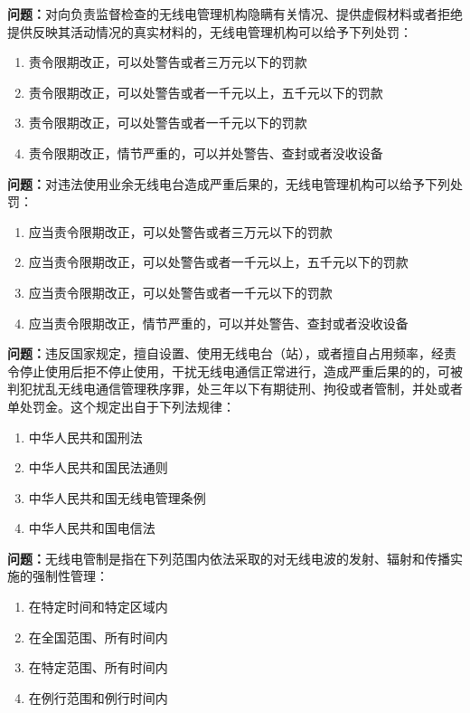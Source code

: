 \bigskip


\noindent\textbf{问题：}对向负责监督检查的无线电管理机构隐瞒有关情况、提供虚假材料或者拒绝提供反映其活动情况的真实材料的，无线电管理机构可以给予下列处罚：
\begin{enumerate}[label=\Alph*), leftmargin=3em]
\item 责令限期改正，可以处警告或者三万元以下的罚款
\item 责令限期改正，可以处警告或者一千元以上，五千元以下的罚款
\item 责令限期改正，可以处警告或者一千元以下的罚款
\item 责令限期改正，情节严重的，可以并处警告、查封或者没收设备
\end{enumerate}

\bigskip


\noindent\textbf{问题：}对违法使用业余无线电台造成严重后果的，无线电管理机构可以给予下列处罚：
\begin{enumerate}[label=\Alph*), leftmargin=3em]
\item 应当责令限期改正，可以处警告或者三万元以下的罚款
\item 应当责令限期改正，可以处警告或者一千元以上，五千元以下的罚款
\item 应当责令限期改正，可以处警告或者一千元以下的罚款
\item 应当责令限期改正，情节严重的，可以并处警告、查封或者没收设备
\end{enumerate}

\bigskip


\noindent\textbf{问题：}违反国家规定，擅自设置、使用无线电台（站），或者擅自占用频率，经责令停止使用后拒不停止使用，干扰无线电通信正常进行，造成严重后果的的，可被判犯扰乱无线电通信管理秩序罪，处三年以下有期徒刑、拘役或者管制，并处或者单处罚金。这个规定出自于下列法规律：
\begin{enumerate}[label=\Alph*), leftmargin=3em]
\item 中华人民共和国刑法
\item 中华人民共和国民法通则
\item 中华人民共和国无线电管理条例
\item 中华人民共和国电信法
\end{enumerate}

\bigskip


\noindent\textbf{问题：}无线电管制是指在下列范围内依法采取的对无线电波的发射、辐射和传播实施的强制性管理：
\begin{enumerate}[label=\Alph*), leftmargin=3em]
\item 在特定时间和特定区域内
\item 在全国范围、所有时间内
\item 在特定范围、所有时间内
\item 在例行范围和例行时间内
\end{enumerate}

